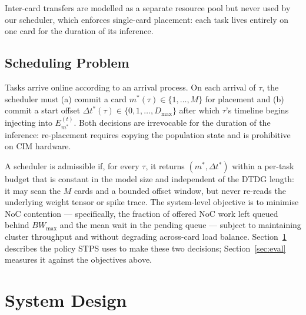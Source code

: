 \documentclass[letterpaper,twocolumn,10pt]{article}
\begin{document}
Inter-card transfers are modelled as a separate resource pool but never used by our scheduler, which enforces single-card placement: each task lives entirely on one card for the duration of its inference.

\subsection{Scheduling Problem}
\label{sec:prelim:problem}

Tasks arrive online according to an arrival process. On each arrival of $\tau$, the scheduler must (a) commit a card $m^{*}(\tau) \in \{1,\dots,M\}$ for placement and (b) commit a start offset $\Delta t^{*}(\tau) \in \{0,1,\dots,D_{\max}\}$ after which $\tau$'s timeline begins injecting into $E_{m^{*}}^{(t)}$. Both decisions are irrevocable for the duration of the inference: re-placement requires copying the population state and is prohibitive on CIM hardware.

A scheduler is admissible if, for every $\tau$, it returns $(m^{*},\Delta t^{*})$ within a per-task budget that is constant in the model size and independent of the DTDG length: it may scan the $M$ cards and a bounded offset window, but never re-reads the underlying weight tensor or spike trace. The system-level objective is to minimise NoC contention --- specifically, the fraction of offered NoC work left queued behind $BW_{\max}$ and the mean wait in the pending queue --- subject to maintaining cluster throughput and without degrading across-card load balance. Section~\ref{sec:design} describes the policy STPS uses to make these two decisions; Section~\ref{sec:eval} measures it against the objectives above.


\section{System Design}
\label{sec:design}
\end{document}
